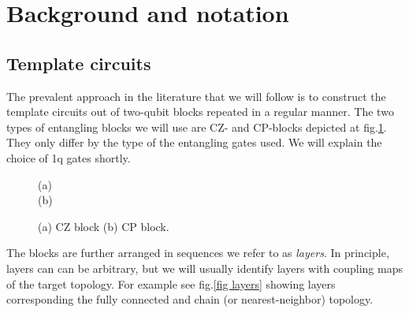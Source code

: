 \documentclass[amsfonts, amssymb, aps, nofootinbib, twocolumn]{revtex4-2}
\begin{document}
\section{Background and notation}
\subsection{Template circuits}
The prevalent approach in the literature \cite{Khatri2019, Madden2021, Rakyta2021, Nakanishi2021, Rakyta2022} that we will follow is to construct the template circuits out of two-qubit blocks repeated in a regular manner. The two types of entangling blocks we will use are CZ- and CP-blocks depicted at fig.\ref{fig blocks}. They only differ by the type of the entangling gates used. We will explain the choice of 1q gates shortly.
\begin{figure}
\begin{flushleft}
(a)
\\
(b)
\end{flushleft}
\caption{(a) CZ block (b) CP block.}
\label{fig blocks}
\end{figure}
The blocks are further arranged in sequences we refer to as \textit{layers}. In principle, layers can can be arbitrary, but we will usually identify layers with coupling maps of the target topology. For example see fig.\ref{fig layers} showing layers corresponding the fully connected and chain (or nearest-neighbor) topology.
\end{document}
